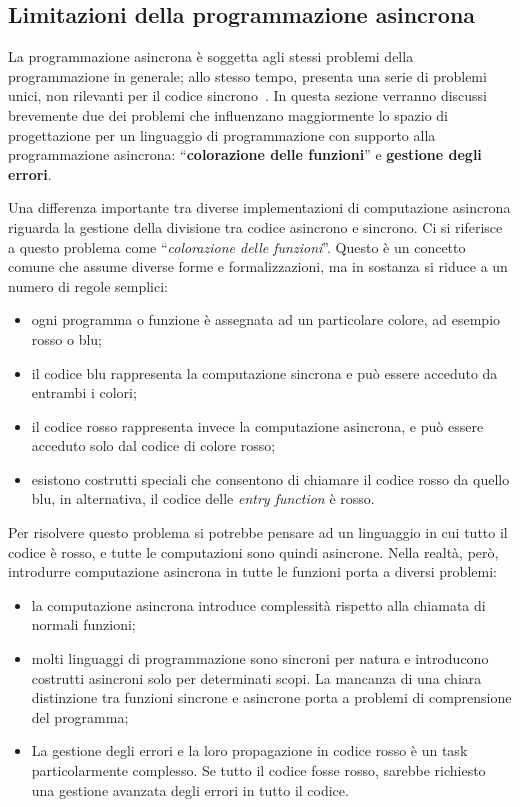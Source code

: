 \documentclass[12pt,a4paper,openright,twoside]{book}
\begin{document}
\subsection{Limitazioni della programmazione asincrona}
\label{sec:async-limitation}
La programmazione asincrona è soggetta agli stessi problemi della programmazione in generale; allo stesso tempo, presenta una serie di problemi unici, non rilevanti per il codice sincrono~\cite{DBLP:conf/oopsla/ElizarovBAU21}. In questa sezione verranno discussi brevemente due dei problemi che influenzano maggiormente lo spazio di progettazione per un linguaggio di programmazione con supporto alla programmazione asincrona: ``\textbf{colorazione delle funzioni}'' e \textbf{gestione degli errori}.

Una differenza importante tra diverse implementazioni di computazione asincrona riguarda la gestione della divisione tra codice asincrono e sincrono. Ci si riferisce a questo problema come ``\textit{colorazione delle funzioni}''.
Questo è un concetto comune che assume diverse forme e formalizzazioni, ma in sostanza si riduce a un numero di regole semplici: 
\begin{itemize}
    \item ogni programma o funzione è assegnata ad un particolare colore, ad esempio rosso o blu; 
    \item il codice blu rappresenta la computazione sincrona e può essere acceduto da entrambi i colori; 
    \item il codice rosso rappresenta invece la computazione asincrona, e può essere acceduto solo dal codice di colore rosso;  
    \item esistono costrutti speciali che consentono di chiamare il codice rosso da quello blu, in alternativa, il codice delle \textit{entry function} è rosso. 
\end{itemize}
Per risolvere questo problema si potrebbe pensare ad un linguaggio in cui tutto il codice è rosso, e tutte le computazioni sono quindi asincrone. Nella realtà, però, introdurre computazione asincrona in tutte le funzioni porta a diversi problemi: 
\begin{itemize}
    \item la computazione asincrona introduce complessità rispetto alla chiamata di normali funzioni;
    \item molti linguaggi di programmazione sono sincroni per natura e introducono costrutti asincroni solo per determinati scopi. La mancanza di una chiara distinzione tra funzioni sincrone e asincrone porta a problemi di comprensione del programma;
    \item La gestione degli errori e la loro propagazione in codice rosso è un task particolarmente complesso. Se tutto il codice fosse rosso, sarebbe richiesto una gestione avanzata degli errori in tutto il codice.  
\end{itemize}
\end{document}
